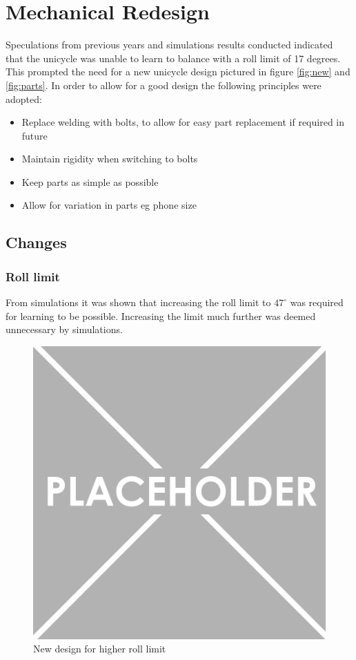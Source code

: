 \documentclass[twoside,twocolumn,12pt]{article}
\begin{document}
\section{Mechanical Redesign}
Speculations from previous years and simulations results conducted indicated that the unicycle was unable to learn to balance with a roll limit of 17 degrees. This prompted the need for a new unicycle design pictured in figure \ref{fig:new} and \ref{fig:parts}. In order to allow for a good design the following principles were adopted:

\begin{itemize}
\item Replace welding with bolts, to allow for easy part replacement if required in future
\item Maintain rigidity when switching to bolts
\item Keep parts as simple as possible
\item Allow for variation in parts eg phone size
\end{itemize}

\subsection{Changes}
\subsubsection{Roll limit}
From simulations it was shown that increasing the roll limit to $47^{\circ}$ was required for learning to be possible. Increasing the limit much further was deemed unnecessary by simulations.

\begin{figure}
  \centering
    \includegraphics[width=\linewidth]{place}
  \caption{New design for higher roll limit}
  \label{fig:newline}
\end{figure}
\end{document}
